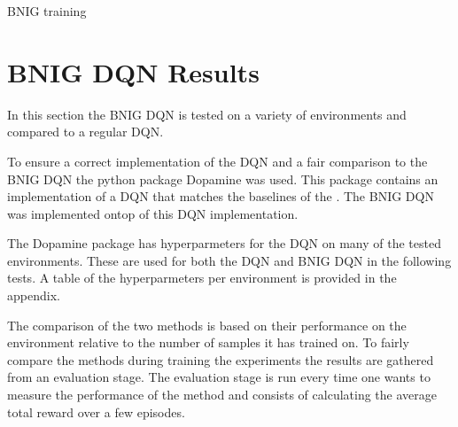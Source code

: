 \begin{algorithm}[H]
    \caption{BNIG training}
    \label{alg:bdqn_train}
\end{algorithm}

\section{BNIG DQN Results}

In this section the BNIG DQN is tested on a variety of environments and compared to a regular DQN. 

To ensure a correct implementation of the DQN and a fair comparison to the BNIG DQN the python package Dopamine\citep{castro_18} was used. This package contains an implementation of a DQN that matches the baselines of the \cite{mnih_2015}. The BNIG DQN was implemented ontop of this DQN implementation.

The Dopamine package has hyperparmeters for the DQN on many of the tested environments. These are used for both the DQN and BNIG DQN in the following tests. A table of the hyperparmeters per environment is provided in the appendix.

The comparison of the two methods is based on their performance on the environment relative to the number of samples it has trained on. To fairly compare the methods during training the experiments the results are gathered from an evaluation stage. The evaluation stage is run every time one wants to measure the performance of the method and consists of calculating the average total reward over a few episodes.

